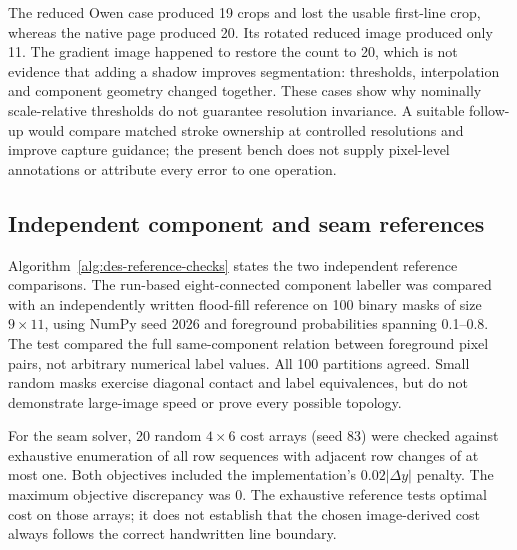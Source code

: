 The reduced Owen case produced 19 crops and lost the usable first-line crop, whereas the native page produced 20. Its rotated reduced image produced only 11. The gradient image happened to restore the count to 20, which is not evidence that adding a shadow improves segmentation: thresholds, interpolation and component geometry changed together. These cases show why nominally scale-relative thresholds do not guarantee resolution invariance. A suitable follow-up would compare matched stroke ownership at controlled resolutions and improve capture guidance; the present bench does not supply pixel-level annotations or attribute every error to one operation.

\subsection{Independent component and seam references}
Algorithm~\ref{alg:des-reference-checks} states the two independent reference comparisons.
The run-based eight-connected component labeller was compared with an independently written flood-fill reference on 100 binary masks of size $9\times11$, using NumPy seed 2026 and foreground probabilities spanning 0.1--0.8. The test compared the full same-component relation between foreground pixel pairs, not arbitrary numerical label values. All 100 partitions agreed. Small random masks exercise diagonal contact and label equivalences, but do not demonstrate large-image speed or prove every possible topology.

For the seam solver, 20 random $4\times6$ cost arrays (seed 83) were checked against exhaustive enumeration of all row sequences with adjacent row changes of at most one. Both objectives included the implementation's $0.02|\Delta y|$ penalty. The maximum objective discrepancy was $0$. The exhaustive reference tests optimal cost on those arrays; it does not establish that the chosen image-derived cost always follows the correct handwritten line boundary.

\begin{designalgorithm}
\caption{Independent partition and seam verification}
\label{alg:des-reference-checks}
\begin{designpseudo}
\end{designpseudo}
\end{designalgorithm}

